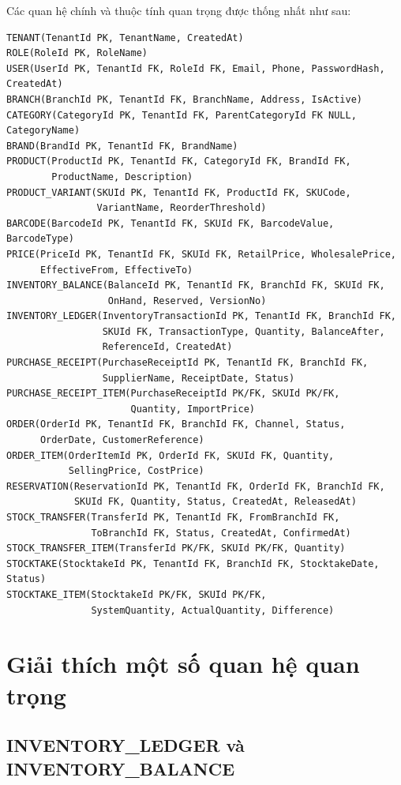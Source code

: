 Các quan hệ chính và thuộc tính quan trọng được thống nhất như sau:

\begin{verbatim}
TENANT(TenantId PK, TenantName, CreatedAt)
ROLE(RoleId PK, RoleName)
USER(UserId PK, TenantId FK, RoleId FK, Email, Phone, PasswordHash, CreatedAt)
BRANCH(BranchId PK, TenantId FK, BranchName, Address, IsActive)
CATEGORY(CategoryId PK, TenantId FK, ParentCategoryId FK NULL, CategoryName)
BRAND(BrandId PK, TenantId FK, BrandName)
PRODUCT(ProductId PK, TenantId FK, CategoryId FK, BrandId FK,
        ProductName, Description)
PRODUCT_VARIANT(SKUId PK, TenantId FK, ProductId FK, SKUCode,
                VariantName, ReorderThreshold)
BARCODE(BarcodeId PK, TenantId FK, SKUId FK, BarcodeValue, BarcodeType)
PRICE(PriceId PK, TenantId FK, SKUId FK, RetailPrice, WholesalePrice,
      EffectiveFrom, EffectiveTo)
INVENTORY_BALANCE(BalanceId PK, TenantId FK, BranchId FK, SKUId FK,
                  OnHand, Reserved, VersionNo)
INVENTORY_LEDGER(InventoryTransactionId PK, TenantId FK, BranchId FK,
                 SKUId FK, TransactionType, Quantity, BalanceAfter,
                 ReferenceId, CreatedAt)
PURCHASE_RECEIPT(PurchaseReceiptId PK, TenantId FK, BranchId FK,
                 SupplierName, ReceiptDate, Status)
PURCHASE_RECEIPT_ITEM(PurchaseReceiptId PK/FK, SKUId PK/FK,
                      Quantity, ImportPrice)
ORDER(OrderId PK, TenantId FK, BranchId FK, Channel, Status,
      OrderDate, CustomerReference)
ORDER_ITEM(OrderItemId PK, OrderId FK, SKUId FK, Quantity,
           SellingPrice, CostPrice)
RESERVATION(ReservationId PK, TenantId FK, OrderId FK, BranchId FK,
            SKUId FK, Quantity, Status, CreatedAt, ReleasedAt)
STOCK_TRANSFER(TransferId PK, TenantId FK, FromBranchId FK,
               ToBranchId FK, Status, CreatedAt, ConfirmedAt)
STOCK_TRANSFER_ITEM(TransferId PK/FK, SKUId PK/FK, Quantity)
STOCKTAKE(StocktakeId PK, TenantId FK, BranchId FK, StocktakeDate, Status)
STOCKTAKE_ITEM(StocktakeId PK/FK, SKUId PK/FK,
               SystemQuantity, ActualQuantity, Difference)
\end{verbatim}

\section{Giải thích một số quan hệ quan trọng}

\subsection{INVENTORY\_LEDGER và INVENTORY\_BALANCE}

